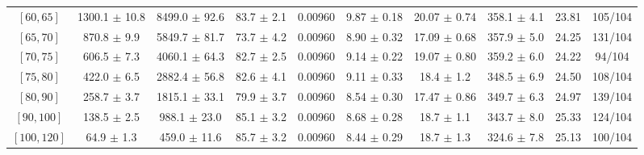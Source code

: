 \begin{tabular}{c||c|c|c|c|c|c|c||c|c}
$[60, 65]$ & 1300.1 $\pm$ 10.8 & 8499.0 $\pm$ 92.6 & 83.7 $\pm$ 2.1 & 0.00960 & 9.87 $\pm$ 0.18 & 20.07 $\pm$ 0.74 & 358.1 $\pm$ 4.1 & 23.81 & 105/104\\
$[65, 70]$ & 870.8 $\pm$ 9.9 & 5849.7 $\pm$ 81.7 & 73.7 $\pm$ 4.2 & 0.00960 & 8.90 $\pm$ 0.32 & 17.09 $\pm$ 0.68 & 357.9 $\pm$ 5.0 & 24.25 & 131/104\\
$[70, 75]$ & 606.5 $\pm$ 7.3 & 4060.1 $\pm$ 64.3 & 82.7 $\pm$ 2.5 & 0.00960 & 9.14 $\pm$ 0.22 & 19.07 $\pm$ 0.80 & 359.2 $\pm$ 6.0 & 24.22 & 94/104\\
$[75, 80]$ & 422.0 $\pm$ 6.5 & 2882.4 $\pm$ 56.8 & 82.6 $\pm$ 4.1 & 0.00960 & 9.11 $\pm$ 0.33 & 18.4 $\pm$ 1.2 & 348.5 $\pm$ 6.9 & 24.50 & 108/104\\
$[80, 90]$ & 258.7 $\pm$ 3.7 & 1815.1 $\pm$ 33.1 & 79.9 $\pm$ 3.7 & 0.00960 & 8.54 $\pm$ 0.30 & 17.47 $\pm$ 0.86 & 349.7 $\pm$ 6.3 & 24.97 & 139/104\\
$[90, 100]$ & 138.5 $\pm$ 2.5 & 988.1 $\pm$ 23.0 & 85.1 $\pm$ 3.2 & 0.00960 & 8.68 $\pm$ 0.28 & 18.7 $\pm$ 1.1 & 343.7 $\pm$ 8.0 & 25.33 & 124/104\\
$[100, 120]$ & 64.9 $\pm$ 1.3 & 459.0 $\pm$ 11.6 & 85.7 $\pm$ 3.2 & 0.00960 & 8.44 $\pm$ 0.29 & 18.7 $\pm$ 1.3 & 324.6 $\pm$ 7.8 & 25.13 & 100/104\\
\end{tabular}
